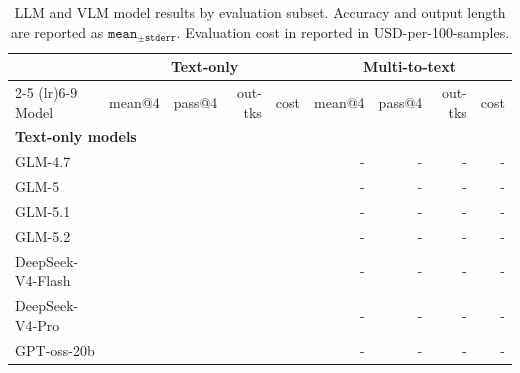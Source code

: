 \begin{table}[t]
\small
\setlength{\tabcolsep}{4pt}
\caption{LLM and VLM model results by evaluation subset. Accuracy and output length are reported as $\texttt{mean}_{\pm \texttt{stderr}}$. Evaluation cost in reported in USD-per-100-samples.}
\label{tab:llm-vlm-leaderboard}
\begin{tabular}{lrrrrrrrr}
\toprule
 & \multicolumn{4}{c}{\textbf{Text-only}} & \multicolumn{4}{c}{\textbf{Multi-to-text}} \\
\cmidrule(lr){2-5} \cmidrule(lr){6-9}
Model & mean@4 & pass@4 & out-tks & cost & mean@4 & pass@4 & out-tks & cost \\
\midrule
\multicolumn{9}{l}{\textbf{Text-only models}} \\
GLM-4.7 & \cellcolor{green!54!red!25!white}{$61.3_{ \pm 4.1}$} & \cellcolor{green!63!red!25!white}{$75.9_{ \pm 4.1}$} & \cellcolor{green!42!red!25!white}{$5346_{ \pm 419}$} & \cellcolor{green!66!red!25!white}{0.91} & - & - & - & - \\
GLM-5 & \cellcolor{green!58!red!25!white}{$64.4_{ \pm 4}$} & \cellcolor{green!66!red!25!white}{$77.8_{ \pm 4}$} & \cellcolor{green!61!red!25!white}{$3404_{ \pm 216}$} & \cellcolor{green!62!red!25!white}{1.11} & - & - & - & - \\
GLM-5.1 & \cellcolor{green!62!red!25!white}{$67.4_{ \pm 4.1}$} & \cellcolor{green!65!red!25!white}{$76.9_{ \pm 4.1}$} & \cellcolor{green!65!red!25!white}{$2948_{ \pm 250}$} & \cellcolor{green!71!red!25!white}{0.69} & - & - & - & - \\
GLM-5.2 & \cellcolor{green!71!red!25!white}{$73.8_{ \pm 3.6}$} & \cellcolor{green!76!red!25!white}{$84.3_{ \pm 3.5}$} & \cellcolor{green!43!red!25!white}{$5229_{ \pm 486}$} & \cellcolor{green!62!red!25!white}{1.09} & - & - & - & - \\
DeepSeek-V4-Flash & \cellcolor{green!63!red!25!white}{$67.6_{ \pm 3.9}$} & \cellcolor{green!69!red!25!white}{$79.6_{ \pm 3.9}$} & \cellcolor{green!59!red!25!white}{$3648_{ \pm 391}$} & \cellcolor{green!79!red!25!white}{0.29} & - & - & - & - \\
DeepSeek-V4-Pro & \cellcolor{green!66!red!25!white}{$70.4_{ \pm 3.8}$} & \cellcolor{green!70!red!25!white}{$80.6_{ \pm 3.8}$} & \cellcolor{green!72!red!25!white}{$2232_{ \pm 201}$} & \cellcolor{green!72!red!25!white}{0.63} & - & - & - & - \\
GPT-oss-20b & \cellcolor{green!42!red!25!white}{$52.3_{ \pm 4.1}$} & \cellcolor{green!51!red!25!white}{$67.6_{ \pm 4.5}$} & \cellcolor{green!69!red!25!white}{$2611_{ \pm 317}$} & \cellcolor{green!85!red!25!white}{0.02} & - & - & - & - \\

\end{tabular}
\end{table}

